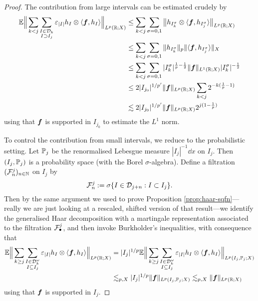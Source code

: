 \begin{proof}
  The contribution from large intervals can be estimated crudely by
  \begin{equation*}
    \begin{aligned}
      \E \Big\| \sum_{k < j} \sum_{\substack{I \in \mc{D}_{k} \\ I \supset I_{j}}} \varepsilon_{|I|} h_{I} \otimes \langle \mb{f}, h_{I} \rangle \Big\|_{L^p(\R;X)}
      &\leq \sum_{k < j} \sum_{\sigma = 0,1} \big\| h_{I^{\sigma}_{k}} \otimes \langle \mb{f}, h_{I^{\sigma}_{j}} \rangle \big\|_{L^p(\R;X)} \\
      &\leq \sum_{k < j} \sum_{\sigma = 0,1} \|h_{I^{\sigma}_{k}}\|_{p} \| \langle \mb{f}, h_{I^{\sigma}_{j}} \rangle \|_{X} \\
      &\leq  \sum_{k < j} \sum_{\sigma = 0,1} |I_{k}^\sigma|^{\frac{1}{p}-\frac{1}{2}} \|\mb{f}\|_{L^1(\R;X)} |I_{k}^{\sigma}|^{-\frac{1}{2}} \\
      &\leq 2|I_{j_{0}}|^{1/p'} \|\mb{f}\|_{L^p(\R;X)} \sum_{k < j} 2^{-k(\frac{1}{p} - 1)} \\
      &\lesssim 2 |I_{j_{0}}|^{1/p'} \|\mb{f}\|_{L^p(\R;X)} 2^{j(1 - \frac{1}{p})}
    \end{aligned}
  \end{equation*}
  using that $\mb{f}$ is supported in $I_{j_{0}}$ to estimate the $L^1$ norm.

  To control the contribution from small intervals, we reduce to the probabilistic setting.
  Let $\P_{j}$ be the renormalised Lebesgue measure $|I_{j}|^{-1} \dd x$ on $I_{j}$.
  Then $(I_{j},\P_{j})$ is a probability space (with the Borel $\sigma$-algebra).
  Define a filtration $(\mc{F}_{n}^{j})_{n \in \N}$ on $I_{j}$ by
  \begin{equation*}
    \mc{F}_{n}^{j} := \sigma\{I \in \mc{D}_{j+n} : I \subset I_{j}\}.
  \end{equation*} 
  Then by the same argument we used to prove Proposition \ref{prop:haar-sqfn}---really we are just looking at a rescaled, shifted version of that result---we identify the generalised Haar decomposition with a martingale representation associated to the filtration $\mc{F}^{j}_{\bullet}$, and then invoke Burkholder's inequalities, with consequence that
  \begin{equation*}
    \begin{aligned}
      \E \Big\| \sum_{k \geq j} \sum_{\substack{I \in \mc{D}_{k}^{\omega} \\ I \subseteq I_{j}}} \varepsilon_{|I|} h_{I} \otimes \langle \mb{f}, h_{I} \rangle \Big\|_{L^p(\R;X)}
      &=  |I_{j}|^{1/p} \E \Big\| \sum_{k \geq j} \sum_{\substack{I \in \mc{D}_{k}^{\omega} \\ I \subseteq I_{j}}} \varepsilon_{|I|} h_{I} \otimes \langle \mb{f}, h_{I} \rangle \Big\|_{L^p(I_{j}, \P_{j};X)} \\
      &\lesssim_{p,X} |I_{j}|^{1/p} \|\mb{f}\|_{L^p(I_{j},\P_{j};X)} 
      \lesssim_{p,X} \|\mb{f}\|_{L^p(\R;X)}
    \end{aligned}
  \end{equation*}
  using that $\mb{f}$ is supported in $I_{j}$.
  

\end{proof}
